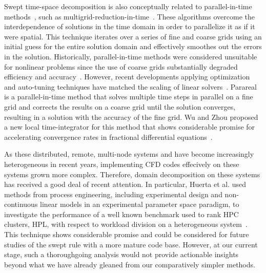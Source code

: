 Swept time-space decomposition is also conceptually related to parallel-in-time methods~\cite{Gander2015}, such as multigrid-reduction-in-time~\cite{falgout2014parallel}.
These algorithms overcome the interdependence of solutions in the time domain in order to parallelize it as if it were spatial.
This technique iterates over a series of fine and coarse grids using an initial guess for the entire solution domain and effectively smoothes out the errors in the solution.
Historically, parallel-in-time methods were considered unsuitable for nonlinear problems since the use of coarse grids substantially degraded efficiency and accuracy~\cite{alhubail:16jcp}.
However, recent developments applying optimization and auto-tuning techniques have matched the scaling of linear solvers~\cite{MGRITImprove}.
Parareal is a parallel-in-time method that solves multiple time steps in parallel on a fine grid
and corrects the results on a coarse grid until the solution converges, resulting in a solution with the accuracy of the fine grid.
Wu and Zhou proposed a new local time-integrator for this method that shows considerable promise
for accelerating convergence rates in fractional differential equations~\cite{PararealWu}.

As these distributed, remote, multi-node systems and have become increasingly heterogeneous in recent years, implementing CFD codes effecively on these systems grown more complex.
Therefore, domain decomposition on these systems has received a good deal of recent attention.
In particular, Huerta et al. used methods from process engineering, including experimental design and non-continuous linear models in an experimental parameter space paradigm, to investigate the performance of a well known benchmark used to rank HPC clusters, HPL, with respect to workload division on a heterogeneous system~\cite{DOEbenchmarks}.
This technique shows considerable promise and could be considered for future studies of the swept rule with a more mature code base.
However, at our current stage, such a thoroughgoing analysis would not provide actionable insights beyond what we have already gleaned from our comparatively simpler methods.
